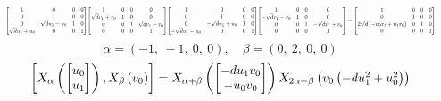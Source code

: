 \documentclass[11pt]{article}
\theoremstyle{definition}
\begin{document}
\[
\scaletoalign{\textwidth}{{\left[\begin{matrix}1 & 0 & 0 & 0\\0 & 1 & 0 & 0\\0 & \sqrt{d} u_{1} - u_{0} & 1 & 0\\\sqrt{d} u_{1} + u_{0} & 0 & 0 & 1\end{matrix}\right]} {\left[\begin{matrix}1 & 0 & 0 & 0\\\sqrt{d} v_{1} + v_{0} & 1 & 0 & 0\\0 & 0 & 1 & \sqrt{d} v_{1} - v_{0}\\0 & 0 & 0 & 1\end{matrix}\right]} {\left[\begin{matrix}1 & 0 & 0 & 0\\0 & 1 & 0 & 0\\0 & - \sqrt{d} u_{1} + u_{0} & 1 & 0\\- \sqrt{d} u_{1} - u_{0} & 0 & 0 & 1\end{matrix}\right]} {\left[\begin{matrix}1 & 0 & 0 & 0\\- \sqrt{d} v_{1} - v_{0} & 1 & 0 & 0\\0 & 0 & 1 & - \sqrt{d} v_{1} + v_{0}\\0 & 0 & 0 & 1\end{matrix}\right]} = {\left[\begin{matrix}1 & 0 & 0 & 0\\0 & 1 & 0 & 0\\2 \sqrt{d} \left(- u_{0} v_{1} + u_{1} v_{0}\right) & 0 & 1 & 0\\0 & 0 & 0 & 1\end{matrix}\right]}}
\]
\[
\alpha = \left( -1, \  -1, \  0, \  0\right), \quad \beta = \left( 0, \  2, \  0, \  0\right)
\]
\[
\scaletoalign{\textwidth}{\left[ X_{\alpha}\left(\left[\begin{matrix}u_{0}\\u_{1}\end{matrix}\right]\right), X_{\beta}\left(v_{0}\right) \right] = X_{\alpha + \beta}\left(\left[\begin{matrix}- d u_{1} v_{0}\\- u_{0} v_{0}\end{matrix}\right]\right) X_{2\alpha + \beta}\left(v_{0} \left(- d u_{1}^{2} + u_{0}^{2}\right)\right)}
\]
\end{document}
